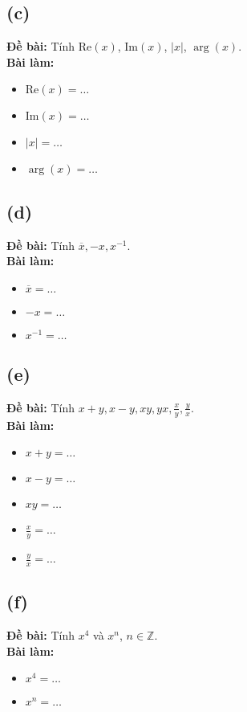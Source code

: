 \subsection{(c)}
\textbf{Đề bài:} Tính $\mathrm{Re}(x)$, $\mathrm{Im}(x)$, $|x|$, $\arg(x)$.\\
\textbf{Bài làm:}
\begin{itemize}
    \item $\mathrm{Re}(x) = \dots$
    \item $\mathrm{Im}(x) = \dots$
    \item $|x| = \dots$
    \item $\arg(x) = \dots$
\end{itemize}

\subsection{(d)}
\textbf{Đề bài:} Tính $\overline{x},-x,x^{-1}$.\\
\textbf{Bài làm:}
\begin{itemize}
    \item $\overline{x} = \dots$
    \item $-x = \dots$
    \item $x^{-1} = \dots$
\end{itemize}

\subsection{(e)}
\textbf{Đề bài:} Tính $x + y, x - y, xy, yx, \frac{x}{y}, \frac{y}{x}$.\\
\textbf{Bài làm:}
\begin{itemize}
    \item $x + y = \dots$
    \item $x - y = \dots$
    \item $xy = \dots$
    \item $\frac{x}{y} = \dots$
    \item $\frac{y}{x} = \dots$
\end{itemize}

\subsection{(f)}
\textbf{Đề bài:} Tính $x^{4}$ và $x^{n}$, $n\in\mathbb{Z}$.\\
\textbf{Bài làm:}
\begin{itemize}
    \item $x^{4} = \dots$
    \item $x^{n} = \dots$
\end{itemize}

